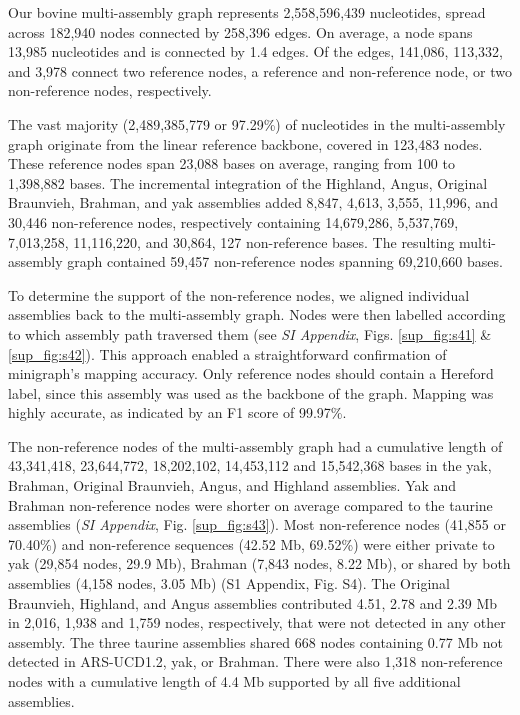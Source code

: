 \documentclass[../main.tex]{subfiles}
\begin{document}
Our bovine multi-assembly graph represents 2,558,596,439 nucleotides, spread across 182,940 nodes connected by 258,396 edges. On average, a node spans 13,985 nucleotides and is connected by 1.4 edges. Of the edges, 141,086, 113,332, and 3,978 connect two reference nodes, a reference and non-reference node, or two non-reference nodes, respectively. 

The vast majority (2,489,385,779 or 97.29\%) of nucleotides in the multi-assembly graph originate from the linear reference backbone, covered in 123,483 nodes. These reference nodes span 23,088 bases on average, ranging from 100 to 1,398,882 bases. The incremental integration of the Highland, Angus, Original Braunvieh, Brahman, and yak assemblies added 8,847, 4,613, 3,555, 11,996, and 30,446 non-reference nodes, respectively containing 14,679,286, 5,537,769, 7,013,258, 11,116,220, and 30,864,
127 non-reference bases. The resulting multi-assembly graph contained 59,457 non-reference nodes spanning 69,210,660 bases. 

To determine the support of the non-reference nodes, we aligned individual assemblies back to the multi-assembly graph. Nodes were then labelled according to which assembly path traversed them (see \emph{SI Appendix}, Figs. \ref{sup_fig:s41} \& \ref{sup_fig:s42}). This approach enabled a straightforward confirmation of minigraph’s mapping accuracy. Only reference nodes should contain a Hereford label, since this assembly was used as the backbone of the graph. Mapping was highly accurate, as indicated by an F1 score of 99.97\%.

The non-reference nodes of the multi-assembly graph had a cumulative length of 43,341,418, 23,644,772, 18,202,102, 14,453,112 and 15,542,368 bases in the yak, Brahman, Original Braunvieh, Angus, and Highland assemblies. Yak and Brahman non-reference nodes were shorter on average compared to the taurine assemblies (\emph{SI Appendix}, Fig. \ref{sup_fig:s43}). Most non-reference nodes (41,855 or 70.40\%) and non-reference sequences (42.52 Mb, 69.52\%) were either private to yak (29,854 nodes, 29.9 Mb), Brahman (7,843 nodes, 8.22 Mb), or shared by both assemblies (4,158 nodes, 3.05 Mb) (S1 Appendix, Fig. S4). The Original Braunvieh, Highland, and Angus assemblies contributed 4.51, 2.78 and 2.39 Mb in 2,016, 1,938 and 1,759 nodes, respectively, that were not detected in any other assembly. The three taurine assemblies shared 668 nodes containing 0.77 Mb not detected in ARS-UCD1.2, yak, or Brahman. There were also 1,318 non-reference nodes with a cumulative length of 4.4 Mb supported by all five additional assemblies.
\end{document}
